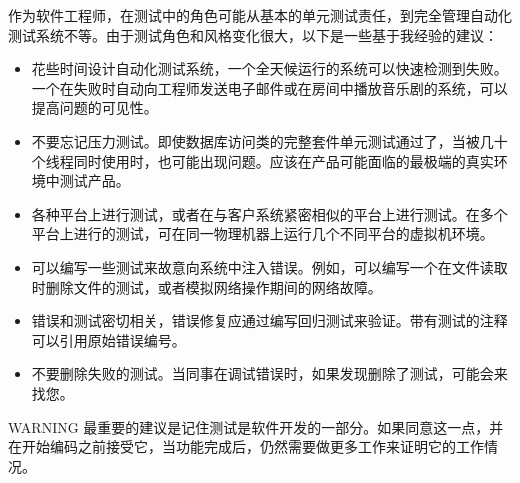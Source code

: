 作为软件工程师，在测试中的角色可能从基本的单元测试责任，到完全管理自动化测试系统不等。由于测试角色和风格变化很大，以下是一些基于我经验的建议：

\begin{itemize}
\item
花些时间设计自动化测试系统，一个全天候运行的系统可以快速检测到失败。一个在失败时自动向工程师发送电子邮件或在房间中播放音乐剧的系统，可以提高问题的可见性。

\item
不要忘记压力测试。即使数据库访问类的完整套件单元测试通过了，当被几十个线程同时使用时，也可能出现问题。应该在产品可能面临的最极端的真实环境中测试产品。

\item
各种平台上进行测试，或者在与客户系统紧密相似的平台上进行测试。在多个平台上进行的测试，可在同一物理机器上运行几个不同平台的虚拟机环境。

\item
可以编写一些测试来故意向系统中注入错误。例如，可以编写一个在文件读取时删除文件的测试，或者模拟网络操作期间的网络故障。

\item
错误和测试密切相关，错误修复应通过编写回归测试来验证。带有测试的注释可以引用原始错误编号。

\item
不要删除失败的测试。当同事在调试错误时，如果发现删除了测试，可能会来找您。
\end{itemize}

\begin{myWarning}{WARNING}
最重要的建议是记住测试是软件开发的一部分。如果同意这一点，并在开始编码之前接受它，当功能完成后，仍然需要做更多工作来证明它的工作情况。
\end{myWarning}